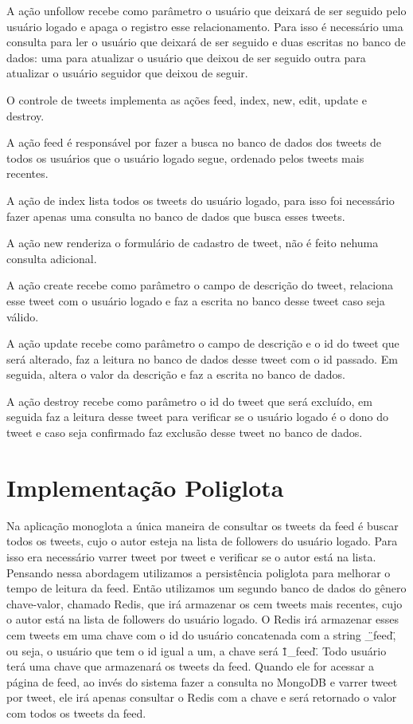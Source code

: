 A ação unfollow recebe como parâmetro o usuário que deixará de ser seguido pelo usuário logado e apaga o registro esse relacionamento. Para isso é necessário uma consulta para ler o usuário que deixará de ser seguido e duas escritas no banco de dados: uma para atualizar o usuário que deixou de ser seguido outra para atualizar o usuário seguidor que deixou de seguir.

O controle de tweets implementa as ações feed, index, new, edit, update e destroy.

A ação feed é responsável por fazer a busca no banco de dados dos tweets de todos os usuários que o usuário logado segue, ordenado pelos tweets mais recentes.

A ação de index lista todos os tweets do usuário logado, para isso foi necessário fazer apenas uma consulta no banco de dados que busca esses tweets.

A ação new renderiza o formulário de cadastro de tweet, não é feito nehuma consulta adicional.

A ação create recebe como parâmetro o campo de descrição do tweet, relaciona esse tweet com o usuário logado e faz a escrita no banco desse tweet caso seja válido.

A ação update recebe como parâmetro o campo de descrição e o id do tweet que será alterado, faz a leitura no banco de dados desse tweet com o id passado. Em seguida, altera o valor da descrição e faz a escrita no banco de dados.

A ação destroy recebe como parâmetro o id do tweet que será excluído, em seguida faz a leitura desse tweet para verificar se o usuário logado é o dono do tweet e caso seja confirmado faz exclusão desse tweet no banco de dados.



\section{Implementação Poliglota}
\label{sec:polyglot}

Na aplicação monoglota a única maneira de consultar os tweets da feed é buscar todos os tweets, cujo o autor esteja na lista de followers do usuário logado. Para isso era necessário varrer tweet por tweet e verificar se o autor está na lista. Pensando nessa abordagem utilizamos a persistência poliglota para melhorar o tempo de leitura da feed.
Então utilizamos um segundo banco de dados do gênero chave-valor, chamado \ac{Redis}, que irá armazenar os cem tweets mais recentes, cujo o autor está na lista de followers do usuário logado.
O \ac{Redis} irá armazenar esses cem tweets em uma chave com o id do usuário concatenada com a string \"\_feed\", ou seja, o usuário que tem o id igual a um, a chave será \"1\_feed\". Todo usuário terá uma chave que armazenará os tweets da feed. Quando ele for acessar a página de feed, ao invés do sistema fazer a consulta no MongoDB e varrer tweet por tweet, ele irá apenas consultar o \ac{Redis} com a chave e será retornado o valor com todos os tweets da feed.


